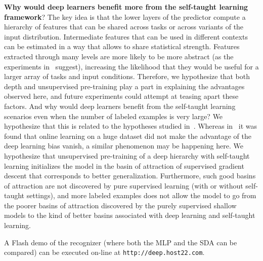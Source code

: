 \documentclass{article} %
\begin{document}
{\bf Why would deep learners benefit more from the self-taught learning framework}?
The key idea is that the lower layers of the predictor compute a hierarchy
of features that can be shared across tasks or across variants of the
input distribution. Intermediate features that can be used in different
contexts can be estimated in a way that allows to share statistical 
strength. Features extracted through many levels are more likely to
be more abstract (as the experiments in~\citet{Goodfellow2009} suggest),
increasing the likelihood that they would be useful for a larger array
of tasks and input conditions.
Therefore, we hypothesize that both depth and unsupervised
pre-training play a part in explaining the advantages observed here, and future
experiments could attempt at teasing apart these factors.
And why would deep learners benefit from the self-taught learning
scenarios even when the number of labeled examples is very large?
We hypothesize that this is related to the hypotheses studied
in~\citet{Erhan+al-2010}. Whereas in~\citet{Erhan+al-2010}
it was found that online learning on a huge dataset did not make the
advantage of the deep learning bias vanish, a similar phenomenon
may be happening here. We hypothesize that unsupervised pre-training
of a deep hierarchy with self-taught learning initializes the
model in the basin of attraction of supervised gradient descent
that corresponds to better generalization. Furthermore, such good
basins of attraction are not discovered by pure supervised learning
(with or without self-taught settings), and more labeled examples
does not allow the model to go from the poorer basins of attraction discovered
by the purely supervised shallow models to the kind of better basins associated
with deep learning and self-taught learning.

A Flash demo of the recognizer (where both the MLP and the SDA can be compared) 
can be executed on-line at {\tt http://deep.host22.com}.

\newpage
{

%

%
}
\end{document}

